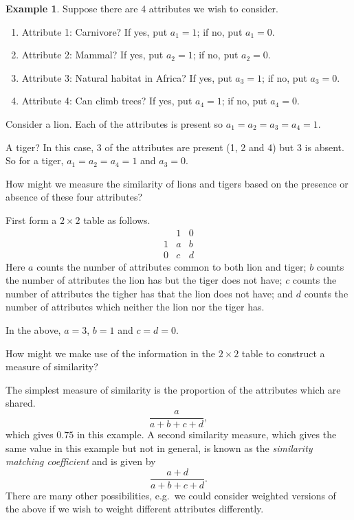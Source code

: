 \documentclass[]{book}
\providecommand{\tightlist}{%
  \setlength{\itemsep}{0pt}\setlength{\parskip}{0pt}}
\theoremstyle{definition}
\theoremstyle{definition}
\newtheorem{example}{Example}[chapter]
\theoremstyle{definition}
\theoremstyle{remark}
\begin{document}
\begin{example}
\protect\hypertarget{exm:unnamed-chunk-6}{}{\label{exm:unnamed-chunk-6} }Suppose there are 4 attributes we wish to consider.

\begin{enumerate}
\def\labelenumi{\arabic{enumi}.}
\tightlist
\item
  Attribute 1: Carnivore? If yes, put \(a_1=1\); if no, put \(a_1=0\).
\item
  Attribute 2: Mammal? If yes, put \(a_2=1\); if no, put \(a_2=0\).
\item
  Attribute 3: Natural habitat in Africa? If yes, put \(a_3=1\); if no, put \(a_3=0\).
\item
  Attribute 4: Can climb trees? If yes, put \(a_4=1\); if no, put \(a_4=0\).
\end{enumerate}

Consider a lion. Each of the attributes is present so \(a_1=a_2=a_3=a_4=1\).

A tiger? In this case, 3 of the attributes are present (1, 2 and 4) but 3 is absent.
So for a tiger, \(a_1=a_2=a_4=1\) and \(a_3=0\).

How might we measure the similarity of lions and tigers based on the presence or absence of these four attributes?

First form a \(2 \times 2\) table as follows.
\[
\begin{array}{cccc}
 &1 &0\\
1& a & b\\
0& c & d
\end{array}
\]
Here \(a\) counts the number of attributes common to both lion and tiger; \(b\) counts the number of attributes the lion has but the tiger does not have; \(c\) counts the number of attributes the tigher has that the lion does not have; and \(d\) counts the number of attributes which neither the lion nor the tiger has.

In the above, \(a=3\), \(b=1\) and \(c=d=0\).

How might we make use of the information in the \(2 \times 2\) table to construct a measure of similarity?

The simplest measure of similarity is the proportion of the attributes which are shared.
\[
\frac{a}{a+b+c+d},
\]
which gives \(0.75\) in this example.
A second similarity measure, which gives the same value in this example but not in general, is known as the \emph{similarity matching coefficient} and is given by
\begin{equation}
\frac{a+d}{a+b+c+d}.
\label{eq:smc}
\end{equation}
There are many other possibilities, e.g.~we could consider weighted versions of the above if we wish to weight different attributes differently.
\end{example}
\end{document}
